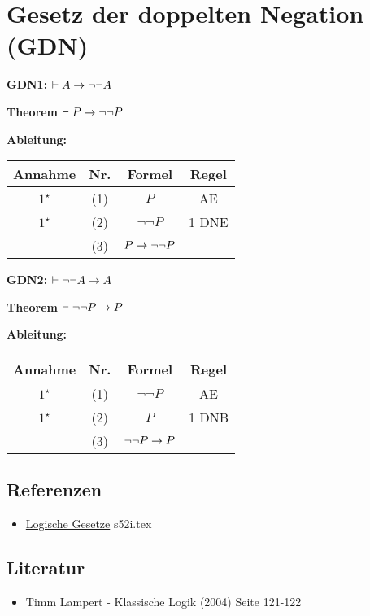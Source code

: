 \documentclass{sajzk}
\begin{document}
\section{Gesetz der doppelten Negation (GDN)}
\label{hubq}

\textbf{GDN1:} $\vdash A\rightarrow\lnot\lnot A$

\textbf{Theorem} $\vdash P\rightarrow\lnot\lnot P$

\textbf{Ableitung:}
\begin{center}
\begin{tabular}{|c|c|c|c|}
  \hline
  Annahme            & Nr. & Formel                     & Regel \\
  \hline
  $1^\star$          & (1)    & $P$                     & AE \\
  \hline
  $1^\star$          & (2)    & $\lnot\lnot P$          & 1 DNE \\
  \hline
                     & (3)    & $P\rightarrow\lnot\lnot P$      & \\
  \hline
\end{tabular}
\end{center}
\newpage
\textbf{GDN2:} $\vdash \lnot\lnot A\rightarrow A$

\textbf{Theorem} $\vdash \lnot\lnot P\rightarrow P$

\textbf{Ableitung:}
\begin{center}
\begin{tabular}{|c|c|c|c|}
  \hline
  Annahme            & Nr. & Formel                     & Regel \\
  \hline
  $1^\star$          & (1)    & $\lnot\lnot P$          & AE \\
  \hline
  $1^\star$          & (2)    & $P$                     & 1 DNB \\
  \hline
                     & (3)    & $\lnot\lnot P\rightarrow P$     & \\
  \hline
\end{tabular}
\end{center}
\subsection{Referenzen}
\begin{itemize}
  \item \href{s52i.pdf}{Logische Gesetze} s52i.tex
\end{itemize}

\subsection{Literatur}
\begin{itemize}
    \item Timm Lampert - Klassische Logik (2004) Seite 121-122
\end{itemize}
\end{document}
